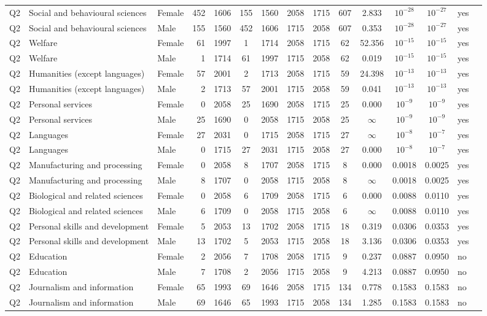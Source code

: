 \begin{longtable}{lllrcccccccccll}
Q2 & Social and behavioural sciences & Female & 452 & 1606 & 155 & 1560 & 2058 & 1715 & 607 & 2.833 & $10^{-28}$ & $10^{-27}$ & yes \\
Q2 & Social and behavioural sciences & Male & 155 & 1560 & 452 & 1606 & 1715 & 2058 & 607 & 0.353 & $10^{-28}$ & $10^{-27}$ & yes \\
Q2 & Welfare & Female & 61 & 1997 & 1 & 1714 & 2058 & 1715 & 62 & 52.356 & $10^{-15}$ & $10^{-15}$ & yes \\
Q2 & Welfare & Male & 1 & 1714 & 61 & 1997 & 1715 & 2058 & 62 & 0.019 & $10^{-15}$ & $10^{-15}$ & yes \\
Q2 & Humanities (except languages) & Female & 57 & 2001 & 2 & 1713 & 2058 & 1715 & 59 & 24.398 & $10^{-13}$ & $10^{-13}$ & yes \\
Q2 & Humanities (except languages) & Male & 2 & 1713 & 57 & 2001 & 1715 & 2058 & 59 & 0.041 & $10^{-13}$ & $10^{-13}$ & yes \\
Q2 & Personal services & Female & 0 & 2058 & 25 & 1690 & 2058 & 1715 & 25 & 0.000 & $10^{-9}$ & $10^{-9}$ & yes \\
Q2 & Personal services & Male & 25 & 1690 & 0 & 2058 & 1715 & 2058 & 25 & $\infty$ & $10^{-9}$ & $10^{-9}$ & yes \\
Q2 & Languages & Female & 27 & 2031 & 0 & 1715 & 2058 & 1715 & 27 & $\infty$ & $10^{-8}$ & $10^{-7}$ & yes \\
Q2 & Languages & Male & 0 & 1715 & 27 & 2031 & 1715 & 2058 & 27 & 0.000 & $10^{-8}$ & $10^{-7}$ & yes \\
Q2 & Manufacturing and processing & Female & 0 & 2058 & 8 & 1707 & 2058 & 1715 & 8 & 0.000 & 0.0018 & 0.0025 & yes \\
Q2 & Manufacturing and processing & Male & 8 & 1707 & 0 & 2058 & 1715 & 2058 & 8 & $\infty$ & 0.0018 & 0.0025 & yes \\
Q2 & Biological and related sciences & Female & 0 & 2058 & 6 & 1709 & 2058 & 1715 & 6 & 0.000 & 0.0088 & 0.0110 & yes \\
Q2 & Biological and related sciences & Male & 6 & 1709 & 0 & 2058 & 1715 & 2058 & 6 & $\infty$ & 0.0088 & 0.0110 & yes \\
Q2 & Personal skills and development & Female & 5 & 2053 & 13 & 1702 & 2058 & 1715 & 18 & 0.319 & 0.0306 & 0.0353 & yes \\
Q2 & Personal skills and development & Male & 13 & 1702 & 5 & 2053 & 1715 & 2058 & 18 & 3.136 & 0.0306 & 0.0353 & yes \\
Q2 & Education & Female & 2 & 2056 & 7 & 1708 & 2058 & 1715 & 9 & 0.237 & 0.0887 & 0.0950 & no \\
Q2 & Education & Male & 7 & 1708 & 2 & 2056 & 1715 & 2058 & 9 & 4.213 & 0.0887 & 0.0950 & no \\
Q2 & Journalism and information & Female & 65 & 1993 & 69 & 1646 & 2058 & 1715 & 134 & 0.778 & 0.1583 & 0.1583 & no \\
Q2 & Journalism and information & Male & 69 & 1646 & 65 & 1993 & 1715 & 2058 & 134 & 1.285 & 0.1583 & 0.1583 & no \\
\end{longtable}
